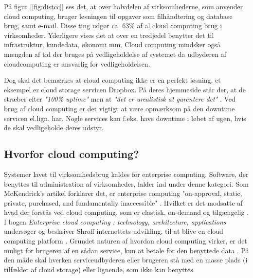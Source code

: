 \newpage
På figur [\ref{fig:distcc}] ses det, at over halvdelen af virksomhederne, som anvender cloud computing, bruger løsningen til opgaver som filhåndtering og database brug, samt e-mail. Disse ting udgør ca. 63\% af al cloud computing brug i virksomheder. Yderligere vises det at over en tredjedel benytter det til infrastruktur, kundedata, økonomi mm. Cloud computing mindsker også mængden af tid der bruges på vedligeholdelse af systemet da udbyderen af cloudcomputing er ansvarlig for vedligeholdelsen. 

Dog skal det bemærkes at cloud computing ikke er en perfekt løsning. et eksempel er cloud storage servicen Dropbox. På deres hjemmeside står der, at de stræber efter \textit{"100\% uptime"} men at \textit{"det er urealistisk at garentere det"} \citep{drpbx_downtime}. Ved brug af cloud computing er det vigtigt at være opmærksom på den downtime servicen el.lign. har. Nogle services kan f.eks. have downtime i løbet af ugen, hvis de skal vedligeholde deres udstyr.

\subsection{Hvorfor cloud computing?}
Systemer lavet til virksomhedsbrug kaldes for enterprise computing. Software, der benyttes til administration af virksomheder, falder ind under denne kategori. Som McKendrick's artikel forklarer det, er enterprise  computing "on-approval, static, private, purchased, and fundamentally inaccessible" \citep{McKendrick2014}. Hvilket er det modsatte af hvad der forstås ved cloud computing, som er elastisk, on-demand og tilgængelig \citep{McKendrick2014}. I bogen \textit{Enterprise cloud computing : technology, architecture, applications} undersøger og beskriver Shroff internettets udvikling, til at blive en cloud computing platform \citep{Shroff2010}. Grundet naturen af hvordan cloud computing virker, er det muligt for brugeren af en sådan service, kun at betale for den benyttede data \citep{Shroff2010}. På den måde skal hverken serviceudbyderen eller brugeren stå med en masse plads (i tilfældet af cloud storage) eller lignende, som ikke kan benyttes. %




